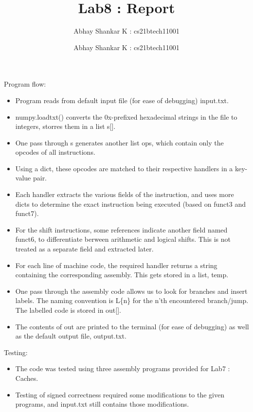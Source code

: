\documentclass[12pt]{amsart}   	%
\author{Abhay Shankar K : cs21btech11001}
\newcommand{\me}{
    \author{Abhay Shankar K : cs21btech11001}
\maketitle
}
\begin{document}
    \title{Lab8 : Report}
    \me

    Program flow:
    \begin{itemize}
        \item Program reads from default input file (for ease of debugging) input.txt.
        \item numpy.loadtxt() converts the 0x-prefixed hexadecimal strings in the file
         to integers, storres them in a list s[].
        \item One pass through s generates another list ops, which contain only the opcodes of all instructions.
        \item Using a dict, these opcodes are matched to their respective handlers in a key-value pair.
        \item Each handler extracts the various fields of the instruction, and uses more dicts to determine the exact instruction being executed (based on funct3 and funct7).
        \item For the shift instructions, some references indicate another field named funct6, to differentiate berween arithmetic and logical shifts. This is not treated as a separate field and extracted later.
        \item For each line of machine code, the required handler returns a string containing the corresponding assembly. This gets stored in a list, temp.
        \item One pass through the assembly code allows us to look for branches and insert labels. The naming convention is L\{n\} for the n'th encountered branch/jump. The labelled code is stored in out[].
        \item The contents of out are printed to the terminal (for ease of debugging) as well as the default output file, output.txt.
    \end{itemize}

    Testing:
    \begin{itemize}
        \item The code was tested using three assembly programs provided for Lab7 : Caches. 
        \item Testing of signed correctness required some modifications to the given programs, and input.txt still contains those modifications.
    \end{itemize}
\end{document}

